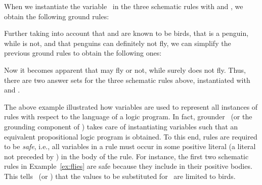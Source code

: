 \begin{example}
When we instantiate the variable~ in the three schematic rules
with  and ,
we obtain the following ground rules:
%

%
Further taking into account that  and  are known to
be birds, that  is a penguin, while  is not, and that
penguins can definitely not fly,
we can simplify the previous ground rules to obtain the following ones:%
%

%
Now it becomes apparent that 
may fly or not, while  surely does not fly.
Thus, there are two answer sets for the three schematic rules above,
instantiated with  and .%
\end{example}

The above example illustrated how variables are used to represent all instances of
rules with respect to the language of a logic program.
In fact, grounder \gringo\ (or the grounding component of \clingo)
takes care of instantiating variables
such that an equivalent propositional logic program is obtained.
To this end,
rules are required to be \emph{safe},
\label{pg:safe}%
%
i.e.,
all variables in a rule must occur in some positive literal
(a literal not preceded by ) in the body of the rule.
For instance, the first two schematic rules in Example~\ref{ex:flies}
are safe because they include  in their positive bodies.
This tells \gringo\ (or \clingo)
that the values to be substituted for~ are limited to birds.

